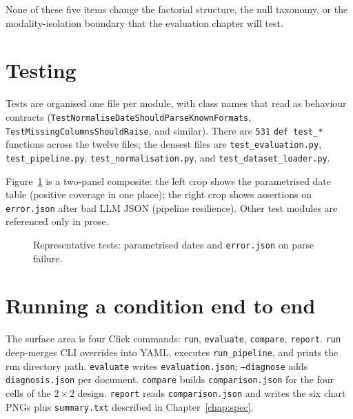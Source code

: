 None of these five items change the factorial structure, the null
taxonomy, or the modality-isolation boundary that the evaluation
chapter will test.

\section{Testing}
\label{sec:impl-testing}

Tests are organised one file per module, with class names that read
as behaviour contracts (\texttt{TestNormaliseDateShouldParseKnownFormats},
\texttt{TestMissingColumnsShouldRaise}, and similar).
There are \texttt{531} \texttt{def test\_*} functions across the
twelve files; the densest files are
\texttt{test\_evaluation.py}, \texttt{test\_pipeline.py},
\texttt{test\_normalisation.py}, and \texttt{test\_dataset\_loader.py}.

Figure~\ref{fig:impl-tests} is a two-panel composite: the left crop
shows the parametrised date table (positive coverage in one place);
the right crop shows assertions on \texttt{error.json} after bad LLM
JSON (pipeline resilience). Other test modules are referenced only in
prose.

\begin{figure}[ht]
    \centering
    \caption{Representative tests: parametrised dates and
    \texttt{error.json} on parse failure.}
    \label{fig:impl-tests}
\end{figure}


\section{Running a condition end to end}
\label{sec:impl-running}

The surface area is four Click commands:
\texttt{run}, \texttt{evaluate}, \texttt{compare}, \texttt{report}.
\texttt{run} deep-merges CLI overrides into YAML, executes
\texttt{run\_pipeline}, and prints the run directory path.
\texttt{evaluate} writes \texttt{evaluation.json};
\texttt{--diagnose} adds \texttt{diagnosis.json} per document.
\texttt{compare} builds \texttt{comparison.json} for the four cells
of the $2 \times 2$ design. \texttt{report} reads
\texttt{comparison.json} and writes the six chart PNGs plus
\texttt{summary.txt} described in Chapter~\ref{chap:spec}.

